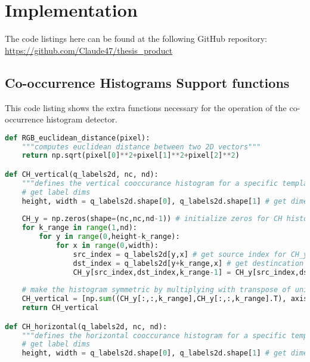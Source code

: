 \appendix

\chapter{Implementation}\label{appendix_implementation}
The code listings here can be found at the following GitHub repository:\\
\url{https://github.com/Claude47/thesis_product}

\section{Co-occurrence Histograms Support functions}\label{appendix_supportCH}
This code listing shows the extra functions necessary for the operation of the
co-occurrence histogram detector.
\begin{lstlisting}[language=Python, caption={Additional functions for Co-occurrence Histogram Detection}, captionpos=b, label={lst:supportCH}]
def RGB_euclidean_distance(pixel):
    """computes euclidean distance between two 2D vectors"""
    return np.sqrt(pixel[0]**2+pixel[1]**2+pixel[2]**2)

def CH_vertical(q_labels2d, nc, nd):
    """defines the vertical cooccurance histogram for a specific template according to quantized colourspace labels matrix and distances"""
    # get label dims
    height, width = q_labels2d.shape[0], q_labels2d.shape[1] # get dimensions
    
    CH_y = np.zeros(shape=(nc,nc,nd-1)) # initialize zeros for CH histogram according to quantizations size
    for k_range in range(1,nd):
        for y in range(0,height-k_range):
            for x in range(0,width):
                src_index = q_labels2d[y,x] # get source index for CH_y at (y,x)
                dst_index = q_labels2d[y+k_range,x] # get destincation index for CH_y at (y+k,x)
                CH_y[src_index,dst_index,k_range-1] = CH_y[src_index,dst_index,k_range-1] + 1 # update histogram count in bin (src_index,dst_index)
                
    # make the histogram symmetric by multiplying with transpose of unidirectional cooccurance histogram
    CH_vertical = [np.sum((CH_y[:,:,k_range],CH_y[:,:,k_range].T), axis=0) for k_range in range(0,nd-1)]
    return CH_vertical

def CH_horizontal(q_labels2d, nc, nd):
    """defines the horizontal cooccurance histogram for a specific template according to quantized colourspace labels matrix and distances"""
    # get label dims
    height, width = q_labels2d.shape[0], q_labels2d.shape[1] # get dimensions
    

\end{lstlisting}
